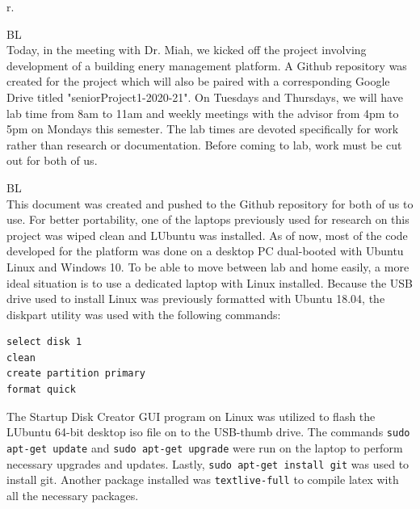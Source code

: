 \documentclass[fontsize=11pt, %
                             paper=letter, %
                             openany, %
                             captions=tableheading,
                             index=totoc,
                             hyperref]{labbook}
\begin{document}
\begin{addmargin}[0cm]{0cm} %

\pagestyle{scrheadings} %

r. 

BL \\
Today, in the meeting with Dr. Miah, we kicked off the project involving development of a building enery management platform. A Github repository was created for the project which will also be paired with a corresponding Google Drive titled "seniorProject1-2020-21". On Tuesdays and Thursdays, we will have lab time from 8am to 11am and weekly meetings with the advisor from 4pm to 5pm on Mondays this semester. The lab times are devoted specifically for work rather than research or documentation. Before coming to lab, work must be cut out for both of us.

BL\\
This document was created and pushed to the Github repository for both of us to use. For better portability, one of the laptops previously used for research on this project was wiped clean and LUbuntu was installed. As of now, most of the code developed for the platform was done on a desktop PC dual-booted with Ubuntu Linux and Windows 10. To be able to move between lab and home easily, a more ideal situation is to use a dedicated laptop with Linux installed. Because the USB drive used to install Linux was previously formatted with Ubuntu 18.04, the diskpart utility was used with the following commands:
\begin{Verbatim}
select disk 1
clean 
create partition primary
format quick
\end{Verbatim}
The Startup Disk Creator GUI program on Linux was utilized to flash the LUbuntu 64-bit desktop iso file on to the USB-thumb drive. The commands \texttt{sudo apt-get update} and \texttt{sudo apt-get upgrade} were run on the laptop to perform necessary upgrades and updates. Lastly, \texttt{sudo apt-get install git} was used to install git. Another package installed was \texttt{textlive-full} to compile latex with all the necessary packages.



\end{addmargin}
\end{document}
